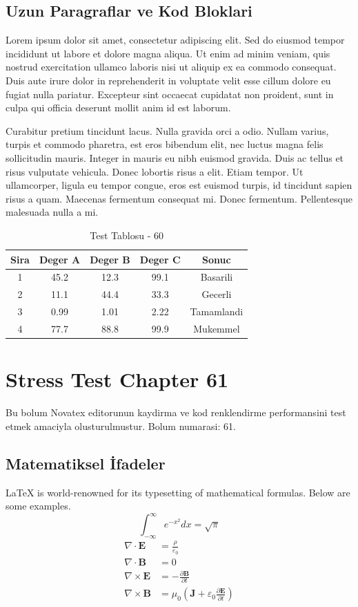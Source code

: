 \documentclass[12pt,a4paper]{article}
\begin{document}
\subsection{Uzun Paragraflar ve Kod Bloklari}
Lorem ipsum dolor sit amet, consectetur adipiscing elit. Sed do eiusmod tempor incididunt ut labore et dolore magna aliqua. Ut enim ad minim veniam, quis nostrud exercitation ullamco laboris nisi ut aliquip ex ea commodo consequat. Duis aute irure dolor in reprehenderit in voluptate velit esse cillum dolore eu fugiat nulla pariatur. Excepteur sint occaecat cupidatat non proident, sunt in culpa qui officia deserunt mollit anim id est laborum.

Curabitur pretium tincidunt lacus. Nulla gravida orci a odio. Nullam varius, turpis et commodo pharetra, est eros bibendum elit, nec luctus magna felis sollicitudin mauris. Integer in mauris eu nibh euismod gravida. Duis ac tellus et risus vulputate vehicula. Donec lobortis risus a elit. Etiam tempor. Ut ullamcorper, ligula eu tempor congue, eros est euismod turpis, id tincidunt sapien risus a quam. Maecenas fermentum consequat mi. Donec fermentum. Pellentesque malesuada nulla a mi.

\begin{table}[h!]
\centering
\begin{tabular}{|c|c|c|c|c|}
\hline
\textbf{Sira} & \textbf{Deger A} & \textbf{Deger B} & \textbf{Deger C} & \textbf{Sonuc} \\
\hline
1 & 45.2 & 12.3 & 99.1 & Basarili \\
2 & 11.1 & 44.4 & 33.3 & Gecerli \\
3 & 0.99 & 1.01 & 2.22 & Tamamlandi \\
4 & 77.7 & 88.8 & 99.9 & Mukemmel \\
\hline
\end{tabular}
\caption{Test Tablosu - 60}
\end{table}

\newpage
\section{Stress Test Chapter 61}
Bu bolum Novatex editorunun kaydirma ve kod renklendirme performansini test etmek amaciyla olusturulmustur. Bolum numarasi: 61.

\subsection{Matematiksel İfadeler}
\LaTeX{} is world-renowned for its typesetting of mathematical formulas. Below are some examples.
\begin{equation}
\int_{-\infty}^{\infty} e^{-x^2} dx = \sqrt{\pi}
\end{equation}
\begin{align}
\nabla \cdot \mathbf{E} &= \frac{\rho}{\varepsilon_0} \\
\nabla \cdot \mathbf{B} &= 0 \\
\nabla \times \mathbf{E} &= -\frac{\partial \mathbf{B}}{\partial t} \\
\nabla \times \mathbf{B} &= \mu_0\left(\mathbf{J} + \varepsilon_0 \frac{\partial \mathbf{E}}{\partial t}\right)
\end{align}
\end{document}
